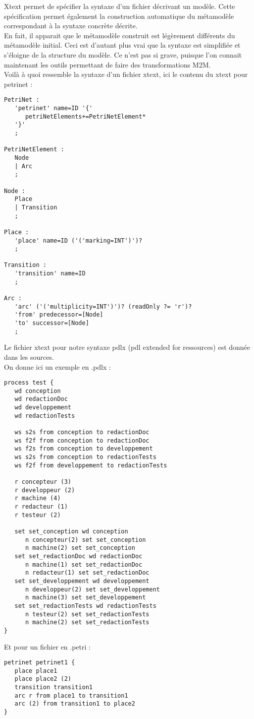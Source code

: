 Xtext permet de spécifier la syntaxe d'un fichier décrivant un modèle.
Cette spécification permet également la construction automatique du métamodèle correspondant à la syntaxe concrète décrite.\\

En fait, il apparait que le métamodèle construit est légèrement différents du métamodèle initial.
Ceci est d'autant plus vrai que la syntaxe est simplifiée et s'éloigne de la structure du modèle.
Ce n'est pas si grave, puisque l'on connait maintenant les outils permettant de faire des transformations M2M.\\

Voilà à quoi ressemble la syntaxe d'un fichier xtext, ici le contenu du xtext pour petrinet :

\begin{lstlisting}
PetriNet :
   'petrinet' name=ID '{'
      petriNetElements+=PetriNetElement*
   '}'
   ;

PetriNetElement :
   Node
   | Arc
   ;

Node :
   Place
   | Transition
   ;

Place :
   'place' name=ID ('('marking=INT')')?
   ;

Transition :
   'transition' name=ID
   ;

Arc :
   'arc' ('('multiplicity=INT')')? (readOnly ?= 'r')?
   'from' predecessor=[Node]
   'to' successor=[Node]
   ;
\end{lstlisting}

Le fichier xtext pour notre syntaxe pdlx (pdl extended for ressources) est donnée dans les sources.\\

On donne ici un exemple en .pdlx :

\begin{lstlisting}
process test {
   wd conception
   wd redactionDoc
   wd developpement
   wd redactionTests

   ws s2s from conception to redactionDoc
   ws f2f from conception to redactionDoc
   ws f2s from conception to developpement
   ws s2s from conception to redactionTests
   ws f2f from developpement to redactionTests

   r concepteur (3)
   r developpeur (2)
   r machine (4)
   r redacteur (1)
   r testeur (2)

   set set_conception wd conception
      n concepteur(2) set set_conception
      n machine(2) set set_conception
   set set_redactionDoc wd redactionDoc
      n machine(1) set set_redactionDoc
      n redacteur(1) set set_redactionDoc
   set set_developpement wd developpement
      n developpeur(2) set set_developpement
      n machine(3) set set_developpement
   set set_redactionTests wd redactionTests
      n testeur(2) set set_redactionTests
      n machine(2) set set_redactionTests
}
\end{lstlisting}

Et pour un fichier en .petri :

\begin{lstlisting}
petrinet petrinet1 {
   place place1
   place place2 (2)
   transition transition1
   arc r from place1 to transition1
   arc (2) from transition1 to place2
}
\end{lstlisting}
